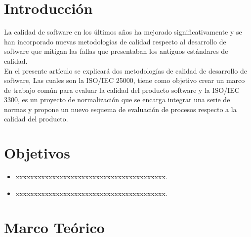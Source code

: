 \documentclass[preprint,12pt]{elsarticle}
\begin{document}
\section{Introducción}
La calidad de software en los últimos años ha mejorado significativamente y se han incorporado nuevas metodologías de calidad respecto al desarrollo de software que mitigan las fallas que presentaban los antiguos estándares de calidad.
\\
En el presente artículo se explicará dos metodologías de calidad de desarrollo de software, Las cuales son la ISO/IEC 25000, tiene como objetivo crear un marco de trabajo común para evaluar la calidad del producto software y la ISO/IEC 3300,  es un proyecto de normalización que se encarga integrar una serie de normas y propone un nuevo esquema de evaluación de procesos respecto a la calidad del producto.
\\

\section{Objetivos}
\begin{itemize}

	\item{\textbf{}} xxxxxxxxxxxxxxxxxxxxxxxxxxxxxxxxxxxxxxxxx.
	\item{\textbf{}} xxxxxxxxxxxxxxxxxxxxxxxxxxxxxxxxxxxxxxxxx.

\end{itemize}


\section{Marco Teórico}

\end{document}
